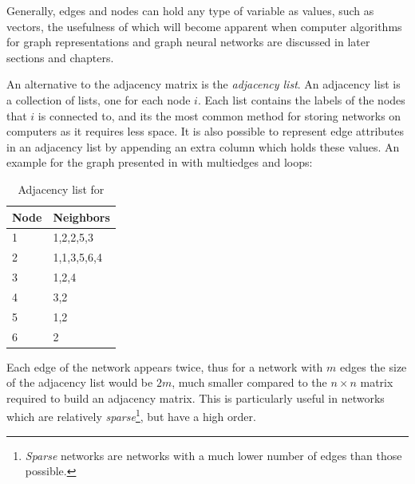 Generally, edges and nodes can hold any type of variable as values,
such as vectors, the usefulness of which will become apparent when
computer algorithms for graph representations and graph neural
networks are discussed in later sections and chapters.

\begin{remark}
  An alternative to the adjacency matrix is the \textit{adjacency
list}. An adjacency list is a collection of lists, one for each node
$i$. Each list contains the labels of the nodes that $i$ is connected
to, and its the most common method for storing networks on computers
as it requires less space. It is also possible to represent edge
attributes in an adjacency list by appending an extra column which
holds these values. An example for the graph presented in
 with multiedges and loops:

\begin{table}[H]
  \centering
\begin{tabular}{|l|l|}
\hline
\rowcolor[HTML]{C0C0C0} 
{\color[HTML]{000000} Node} & {\color[HTML]{000000} Neighbors} \\ \hline
1                           & 1,2,2,5,3                        \\ \hline
2                           & 1,1,3,5,6,4                     \\ \hline
3                           & 1,2,4                           \\ \hline
4                           & 3,2                             \\ \hline
5                           & 1,2                             \\ \hline
6                           & 2                                \\ \hline
\end{tabular}
\label{table:adj_list_ex}
\caption{Adjacency list for }
\end{table}
Each edge of the network appears twice, thus for a network with $m$
edges the size of the adjacency list would be $2m$, much smaller
compared to the $n \times n$ matrix required to build an adjacency
matrix. This is particularly useful in networks which are relatively
\textit{sparse}\footnote{\textit{Sparse} networks are networks with a
much lower number of edges than those possible.}, but have a high
order.
\end{remark}